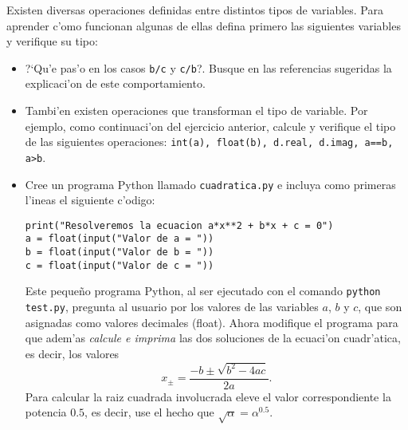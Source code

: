 \documentclass[11pt]{exam}
\begin{document}
\begin{questions}
\begin{parts}
\end{parts}

\item Existen diversas operaciones definidas entre distintos tipos de variables. Para aprender c'omo funcionan algunas de ellas defina primero las siguientes variables y verifique su tipo:
\begin{itemize}

\begin{verbatim}
a = 3.14
b = 2
c = 5
d = 6+2j
e = "hola "
f = "gente"
g = True
\end{verbatim}

A continuaci'on imprima el valor y el tipo del resultado de las siguientes operaciones: \texttt{a+b, a+d, a+e, b+c, b+d, b+e, f+e, e+f, a*b, a*d, a*e, b*c, b*d, c*e, e*f, a**b, a**d, a**e, b**c, e**a, e**b, e**f, a/b, a/d, a/e, b/c, b/d, b/e, c/b, d/a, d/b, e/a, e/b, e/f,  a*g, b*g, not(g), g and False, g and True, g or False, g or True}. ?`Cu'ales de estas operaciones no est'an definidas?

\item ?`Qu'e pas'o en los casos \texttt{b/c} y \texttt{c/b}?. Busque en las referencias sugeridas la explicaci'on de este comportamiento.

\item Tambi'en existen operaciones que transforman el tipo de variable. Por ejemplo, como continuaci'on del ejercicio anterior, calcule y verifique el tipo de las siguientes operaciones: \texttt{int(a), float(b), d.real, d.imag, a==b, a>b}.

\item Cree un programa Python llamado \texttt{cuadratica.py} e incluya como primeras l'ineas el siguiente c'odigo:

\begin{verbatim}
print("Resolveremos la ecuacion a*x**2 + b*x + c = 0")
a = float(input("Valor de a = "))
b = float(input("Valor de b = "))
c = float(input("Valor de c = "))
\end{verbatim}

Este peque\~no programa Python, al ser ejecutado con el comando \texttt{python test.py}, pregunta al usuario por los valores de las variables $a$, $b$ y $c$, que son asignadas como valores decimales (float). Ahora modifique el programa para que adem'as \textit{calcule e imprima} las dos soluciones de la ecuaci'on cuadr'atica, es decir, los valores 
\begin{equation}
x_\pm=\frac{-b\pm\sqrt{b^2-4ac}}{2a}.
\end{equation}
Para calcular la raiz cuadrada involucrada eleve el valor correspondiente la potencia $0.5$, es decir, use el hecho que $\sqrt{\alpha}=\alpha^{0.5}$.
\end{itemize}


\end{questions}
\end{document}

